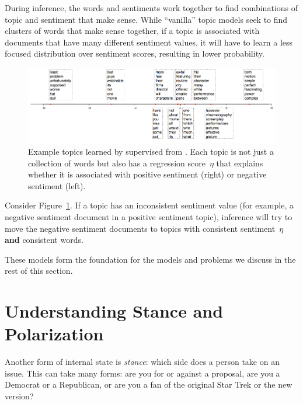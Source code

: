 During inference, the words and sentiments work together to find
combinations of topic and sentiment that make sense.  While
``vanilla'' topic models seek to find clusters of words that make
sense together, if a topic is associated with documents that have many
different sentiment values, it will have to learn a less focused distribution over
sentiment scores, resulting in lower probability.  

\begin{figure}
  \begin{center}
    \includegraphics[width=1.0\linewidth]{figures/slda}
  \end{center}
  \caption{Example topics learned by supervised  from
    \citet{blei-07b}.  Each topic is not just a collection of words
    but also has a regression score~$\eta$ that explains whether it is
    associated with positive sentiment (right) or negative sentiment
    (left).}
  \label{fig:slda-topics}
\end{figure}

Consider Figure~\ref{fig:slda-topics}.  If a topic has an inconsistent
sentiment value (for example, a negative sentiment document in a
positive sentiment topic), inference will try to move the negative
sentiment documents to topics with consistent sentiment~$\eta$ {\bf
  and} consistent words.  

These models form the foundation for the models and problems we
discuss in the rest of this section.

\section{Understanding Stance and Polarization}

Another form of internal state is \emph{stance}: which side does a
person take on an issue.  This can take many forms: are you for or
against a proposal, are you a Democrat or a Republican, or are you a
fan of the original Star Trek or the new version?

